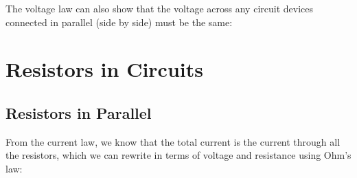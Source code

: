 %  
%
%
%
%
%  

%    
The voltage law can also show that the voltage across any circuit devices
connected in parallel (side by side) must be the same:
%    
%  
%
%
%
%
\section{Resistors in Circuits}

\subsection{Resistors in Parallel}

\begin{figure}[ht]
  \centering
\end{figure}
From the current law, we know that the total current is the current through all
the resistors, which we can rewrite in terms of voltage and resistance using
Ohm's law:
%
    
